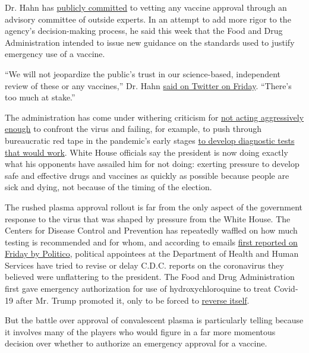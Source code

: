 Dr. Hahn has
\href{https://www.healthaffairs.org/do/10.1377/hblog20200814.996612/full/}{publicly
committed} to vetting any vaccine approval through an advisory committee
of outside experts. In an attempt to add more rigor to the agency's
decision-making process, he said this week that the Food and Drug
Administration intended to issue new guidance on the standards used to
justify emergency use of a vaccine.

``We will not jeopardize the public's trust in our science-based,
independent review of these or any vaccines,'' Dr. Hahn
\href{https://twitter.com/SteveFDA/status/1304454630131281923?s=20}{said
on Twitter on Friday}. ``There's too much at stake.''

The administration has come under withering criticism for
\href{https://www.nytimes3xbfgragh.onion/2020/04/11/us/politics/coronavirus-trump-response.html}{not
acting aggressively enough} to confront the virus and failing, for
example, to push through bureaucratic red tape in the pandemic's early
stages
\href{https://www.nytimes3xbfgragh.onion/2020/03/28/us/testing-coronavirus-pandemic.html}{to
develop diagnostic tests that would work}. White House officials say the
president is now doing exactly what his opponents have assailed him for
not doing: exerting pressure to develop safe and effective drugs and
vaccines as quickly as possible because people are sick and dying, not
because of the timing of the election.

The rushed plasma approval rollout is far from the only aspect of the
government response to the virus that was shaped by pressure from the
White House. The Centers for Disease Control and Prevention has
repeatedly waffled on how much testing is recommended and for whom, and
according to emails
\href{https://www.politico.com/news/2020/09/11/exclusive-trump-officials-interfered-with-cdc-reports-on-covid-19-412809}{first
reported on Friday by Politico}, political appointees at the Department
of Health and Human Services have tried to revise or delay C.D.C.
reports on the coronavirus they believed were unflattering to the
president. The Food and Drug Administration first gave emergency
authorization for use of hydroxychloroquine to treat Covid-19 after Mr.
Trump promoted it, only to be forced to
\href{https://www.nytimes3xbfgragh.onion/2020/06/15/health/fda-hydroxychloroquine-malaria.html}{reverse
itself}.

But the battle over approval of convalescent plasma is particularly
telling because it involves many of the players who would figure in a
far more momentous decision over whether to authorize an emergency
approval for a vaccine.

